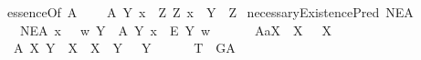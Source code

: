 \begin{isabellebody}
\isanewline
{}\isamarkupfalse%
\ essenceOf{\isacharcolon}{\isacharcolon}{\isachardoublequoteopen}{\isasymup}{\isasymlangle}{\isasymup}{\isasymlangle}{\isasymzero}{\isasymrangle}{\isacharcomma}{\isasymzero}{\isasymrangle}{\isachardoublequoteclose}\ {\isacharparenleft}{\isachardoublequoteopen}{\isasymE}\isactrlsup A{\isachardoublequoteclose}{\isacharparenright}\ \ %
\isanewline
\ \ {\isachardoublequoteopen}{\isasymE}\isactrlsup A\ Y\ x\ {\isasymequiv}\ {\isacharparenleft}\isactrlbold {\isasymforall}Z{\isachardot}\ \isactrlbold {\isasymbox}{\isacharparenleft}Z\ x{\isacharparenright}\ \isactrlbold {\isasymleftrightarrow}\ Y\ {\isasymRrightarrow}\ Z{\isacharparenright}{\isachardoublequoteclose}\isanewline
{}\isamarkupfalse%
\ necessaryExistencePred{\isacharcolon}{\isacharcolon}{\isachardoublequoteopen}{\isasymup}{\isasymlangle}{\isasymzero}{\isasymrangle}{\isachardoublequoteclose}\ {\isacharparenleft}{\isachardoublequoteopen}NE\isactrlsup A{\isachardoublequoteclose}{\isacharparenright}\ %
\isanewline
\ \ \ {\isachardoublequoteopen}NE\isactrlsup A\ x\ \ {\isasymequiv}\ {\isacharparenleft}{\isasymlambda}w{\isachardot}\ {\isacharparenleft}\isactrlbold {\isasymforall}Y{\isachardot}\ \ {\isasymE}\isactrlsup A\ Y\ x\ \isactrlbold {\isasymrightarrow}\ \isactrlbold {\isasymbox}\isactrlbold {\isasymexists}\isactrlsup E\ Y{\isacharparenright}\ w{\isacharparenright}{\isachardoublequoteclose}\isanewline
\ \ \isanewline
{}\isamarkupfalse%
\ \isanewline
\ \ A{}a{\isacharcolon}{\isachardoublequoteopen}{\isasymlfloor}\isactrlbold {\isasymforall}X{\isachardot}\ {\isasymP}\ {\isacharparenleft}\isactrlbold {\isasymrightharpoondown}X{\isacharparenright}\ \isactrlbold {\isasymrightarrow}\ \isactrlbold {\isasymnot}{\isacharparenleft}{\isasymP}\ X{\isacharparenright}\ {\isasymrfloor}{\isachardoublequoteclose}\ \ \ \ \ \ \ \ \ \ \ \isanewline
\ \ A{}{\isacharcolon}\ {\isachardoublequoteopen}{\isasymlfloor}\isactrlbold {\isasymforall}X\ Y{\isachardot}\ {\isacharparenleft}{\isasymP}\ X\ \isactrlbold {\isasymand}\ {\isacharparenleft}X\ {\isasymRrightarrow}\ Y{\isacharparenright}{\isacharparenright}\ \isactrlbold {\isasymrightarrow}\ {\isasymP}\ Y{\isasymrfloor}{\isachardoublequoteclose}\ \ \ \ \isanewline
\ \ T{}{\isacharcolon}\ {\isachardoublequoteopen}{\isasymlfloor}{\isasymP}\ G\isactrlsup A{\isasymrfloor}{\isachardoublequoteclose}\ \ \ \ \ \ \ \ \isanewline

\end{isabellebody}
